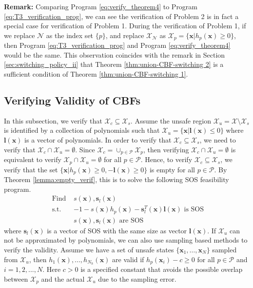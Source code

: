 \documentclass[letterpaper, 10 pt, conference]{ieeeconf}  %
\begin{document}
\textbf{Remark: }Comparing Program \eqref{eq:verify_theorem4} to Program \eqref{eq:T3_verification_prog}, we can see the verification of Problem 2 is in fact a special case for verification of Problem 1. During the verification of Problem 1, if we replace $\mathcal{N}$ as the index set $\{p\}$, and replace $\mathcal{X}_{\mathcal{N}}$ as $\mathcal{X}_p = \{\mathbf{x}|h_p(\mathbf{x})\geq 0\}$, then Program \eqref{eq:T3_verification_prog} and Program \eqref{eq:verify_theorem4} would be the same. This observation coincides with the remark in Section \ref{sec:switching_policy_ii} that Theorem \ref{thm:union-CBF-switching 2} is a sufficient condition of Theorem \ref{thm:union-CBF-switching 1}. 


\subsection{Verifying Validity of CBFs}
In this subsection, we verify that $\mathcal{X}_c \subseteq \mathcal{X}_s$. Assume the unsafe region $\mathcal{X}_u = \mathcal{X}\setminus\mathcal{X}_s$ is identified by a collection of polynomials such that $\mathcal{X}_u=\{\mathbf{x}|\mathbf{l}(\mathbf{x})\leq 0\}$ where $\mathbf{l}(\mathbf{x})$ is a vector of polynomials. In order to verify that $\mathcal{X}_c \subseteq \mathcal{X}_s$, we need to verify that $\mathcal{X}_c\cap\mathcal{X}_u=\emptyset$. Since $\mathcal{X}_c = \cup_{p\in\mathcal{P}}\mathcal{X}_p$, then verifying $\mathcal{X}_c\cap\mathcal{X}_u=\emptyset$ is equivalent to verify $\mathcal{X}_p\cap\mathcal{X}_u = \emptyset$ for all $p\in\mathcal{P}$. Hence, to verify $\mathcal{X}_c \subseteq \mathcal{X}_s$, we verify that the set $\{\mathbf{x}|h_p(\mathbf{x})\geq 0, -\mathbf{l}(\mathbf{x})\geq 0\}$ is empty for all $p\in\mathcal{P}$. By Theorem \ref{lemma:empty_verif}, this is to solve the following SOS feasibility program.
\begin{subequations}
\label{eq:verify_validity_prog}
\begin{align}
    \text{ Find }&s(\mathbf{x}), \mathbf{s}_{l}(\mathbf{x}) \\
    \text{ s.t. }& -1 - s(\mathbf{x})h_p(\mathbf{x}) - \mathbf{s}^T_l(\mathbf{x})\mathbf{l}(\mathbf{x}) \text{ is SOS}\\
    &s(\mathbf{x}), \mathbf{s}_{l}(\mathbf{x}) \text{ are SOS}
\end{align}
\end{subequations}
where $\mathbf{s}_l(\mathbf{x})$ is a vector of SOS with the same size as vector $\mathbf{l}(\mathbf{x})$. {If $\mathcal{X}_u$ can not be approximated by polynomials, we can also use sampling based methods to verify the validity. Assume we have a set of unsafe states $\{\mathbf{x}_1,\dots,\mathbf{x}_N\}$ sampled from $\mathcal{X}_u$, then $h_1(\mathbf{x}),...,h_{N_h}(\mathbf{x})$ are valid if $h_p(\mathbf{x}_i) - c\geq 0$ for all $p\in\mathcal{P}$ and $i=1,2,...,N$. Here $c > 0$ is a specified constant that avoids the possible overlap between $\mathcal{X}_p$ and the actual $\mathcal{X}_u$ due to the sampling error.}
\end{document}
